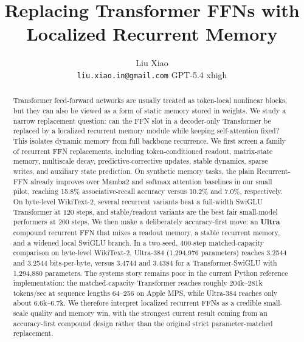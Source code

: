 \documentclass[11pt]{article}
\title{Replacing Transformer FFNs with Localized Recurrent Memory}
\author{
Liu Xiao \\
\texttt{liu.xiao.in@gmail.com}
\And
GPT-5.4 xhigh
}
\date{}
\begin{document}
\maketitle

\begin{abstract}
Transformer feed-forward networks are usually treated as token-local nonlinear
blocks, but they can also be viewed as a form of static memory stored in
weights. We study a narrow replacement question: can the FFN slot in a
decoder-only Transformer be replaced by a localized recurrent memory module
while keeping self-attention fixed? This isolates dynamic memory from full
backbone recurrence. We first screen a family of recurrent FFN replacements,
including token-conditioned readout, matrix-state memory, multiscale decay,
predictive-corrective updates, stable dynamics, sparse writes, and auxiliary
state prediction. On synthetic memory tasks, the plain Recurrent-FFN already
improves over Mamba2 and softmax attention baselines in our small pilot,
reaching 15.8\% associative-recall accuracy versus 10.2\% and 7.0\%,
respectively. On byte-level WikiText-2, several recurrent variants beat a
full-width SwiGLU Transformer at 120 steps, and stable/readout variants are the
best fair small-model performers at 200 steps. We then make a deliberately
accuracy-first move: an \textbf{Ultra} compound recurrent FFN that mixes a
readout memory, a stable recurrent memory, and a widened local SwiGLU branch.
In a two-seed, 400-step matched-capacity comparison on byte-level WikiText-2,
Ultra-384 (1,294,976 parameters) reaches 3.2544 and 3.2544 bits-per-byte,
versus 3.4744 and 3.4384 for a Transformer-SwiGLU with 1,294,880 parameters.
The systems story remains poor in the current Python reference
implementation: the matched-capacity Transformer reaches roughly
204k--281k tokens/sec at sequence lengths 64--256 on Apple MPS, while
Ultra-384 reaches only about 6.6k--6.7k. We therefore interpret localized
recurrent FFNs as a credible small-scale quality and memory win, with the
strongest current result coming from an accuracy-first compound design rather
than the original strict parameter-matched replacement.
\end{abstract}
\end{document}
